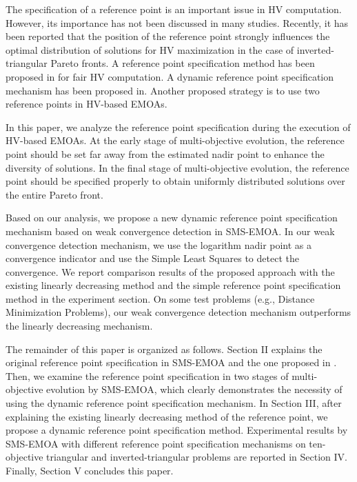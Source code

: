 \documentclass[conference]{IEEEtran}
\begin{document}
The specification of a reference point is an important issue in HV computation. 
However, its importance has not been discussed in many studies. 
Recently, it has been reported that the position of the reference point strongly influences the optimal distribution of solutions 
for HV maximization in the case of inverted-triangular Pareto fronts\cite{hisao:RPhowtoSpecify, hisao:RPspecify, hisao:RPexplanation}. 
A reference point specification method has been proposed in \cite{hisao:RPhowtoSpecify} for fair HV computation.
A dynamic reference point specification mechanism has been proposed in\cite{hisao:dynamic}.
Another proposed strategy is to use two reference points in HV-based EMOAs\cite{hisao:twoRP}. 

In this paper, we analyze the reference point specification during the execution of HV-based EMOAs.
At the early stage of multi-objective evolution, 
the reference point should be set far away from the estimated nadir point to enhance the diversity of solutions. 
In the final stage of multi-objective evolution, 
the reference point should be specified properly to obtain uniformly distributed solutions over the entire Pareto front.

Based on our analysis, we propose a new dynamic reference point specification mechanism based on weak convergence detection in SMS-EMOA. 
In our weak convergence detection mechanism, we use the logarithm nadir point as a convergence indicator
and use the Simple Least Squares\cite{SimpleLeastSquares} to detect the convergence. 
We report comparison results of the proposed approach with the existing linearly decreasing method and 
the simple reference point specification method in the experiment section. 
On some test problems (e.g., Distance Minimization Problems\cite{dmp}), 
our weak convergence detection mechanism outperforms the linearly decreasing mechanism. 

The remainder of this paper is organized as follows. 
Section II explains the original reference point specification in SMS-EMOA and the one proposed in \cite{hisao:RPhowtoSpecify}. 
Then, we examine the reference point specification in two stages of multi-objective evolution by SMS-EMOA, 
which clearly demonstrates the necessity of using the dynamic reference point specification mechanism. 
In Section III, after explaining the existing linearly decreasing method of the reference point, we propose a dynamic reference point
specification method. 
Experimental results by SMS-EMOA with different reference point specification mechanisms 
on ten-objective triangular and inverted-triangular problems are reported in Section IV. 
Finally, Section V concludes this paper. 
\end{document}
